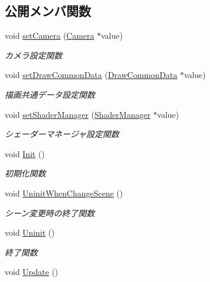 \subsection*{公開メンバ関数}
\begin{DoxyCompactItemize}
\item 
void \mbox{\hyperlink{class_motion_blur_ab4f38538f4a0ca8e444109aa090537ee}{set\+Camera}} (\mbox{\hyperlink{class_camera}{Camera}} $\ast$value)
\begin{DoxyCompactList}\small\item\em カメラ設定関数 \end{DoxyCompactList}\item 
void \mbox{\hyperlink{class_motion_blur_ac33ebb6a66254418212786178f4e4479}{set\+Draw\+Common\+Data}} (\mbox{\hyperlink{class_draw_common_data}{Draw\+Common\+Data}} $\ast$value)
\begin{DoxyCompactList}\small\item\em 描画共通データ設定関数 \end{DoxyCompactList}\item 
void \mbox{\hyperlink{class_motion_blur_a801a9afbb4ee439af84bbaa2050cd414}{set\+Shader\+Manager}} (\mbox{\hyperlink{class_shader_manager}{Shader\+Manager}} $\ast$value)
\begin{DoxyCompactList}\small\item\em シェーダーマネージャ設定関数 \end{DoxyCompactList}\item 
void \mbox{\hyperlink{class_motion_blur_a93f61cc3a14ed681e026d286a51da059}{Init}} ()
\begin{DoxyCompactList}\small\item\em 初期化関数 \end{DoxyCompactList}\item 
void \mbox{\hyperlink{class_motion_blur_ada6365aa40bddda3adf76695e9651e89}{Uninit\+When\+Change\+Scene}} ()
\begin{DoxyCompactList}\small\item\em シーン変更時の終了関数 \end{DoxyCompactList}\item 
void \mbox{\hyperlink{class_motion_blur_a4bceb3a1e625653a0037af10fa5cf422}{Uninit}} ()
\begin{DoxyCompactList}\small\item\em 終了関数 \end{DoxyCompactList}\item 
void \mbox{\hyperlink{class_motion_blur_a931793c39ebeed7da3406f3aeaa7452e}{Update}} ()

\end{DoxyCompactItemize}

